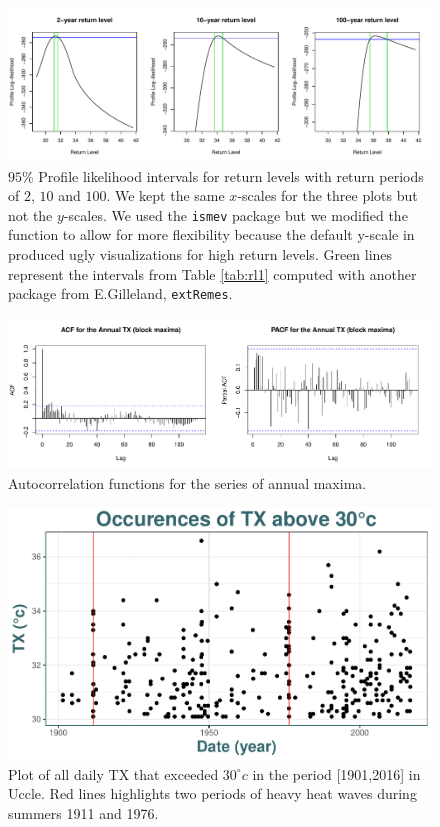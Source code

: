 \begin{figure}[!htb]
	\centering	\includegraphics[width=.95\linewidth]{proflikrl.pdf}\caption{ $95\%$ Profile likelihood intervals for return levels with return periods of $2$, $10$ and $100$. We kept the same $x$-scales for the three plots but not the $y$-scales. We used the \texttt{ismev} package but we modified the function to allow for more flexibility because the default y-scale in produced ugly visualizations for high return levels. Green lines represent the intervals from Table \ref{tab:rl1} computed with another package from E.Gilleland, \texttt{extRemes}. }\label{fig:proflikrl}
\end{figure}


\begin{figure}[!htb]
	\centering	\includegraphics[width=.95\linewidth]{acf_gev.pdf}\caption{Autocorrelation functions for the series of annual maxima.}\label{fig:acf_gev}
\end{figure}




\begin{figure}[!htb]
\centering\includegraphics[width=0.7\linewidth]{abo.pdf}
\caption{Plot of all daily TX that exceeded $30^{\circ}c$ in the period [1901,2016] in Uccle. Red lines highlights two periods of heavy heat waves during summers 1911 and 1976.}\label{fig:abo}
\end{figure}


